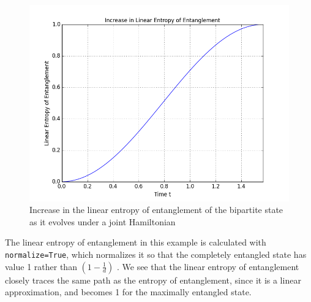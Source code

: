\begin{center}
\begin{figure}[H]
  \begin{center}
    \includegraphics[scale=0.62]{figures/timeevolution-02.png}
    \caption{Increase in the linear entropy of entanglement of the bipartite state as it evolves under a joint Hamiltonian}
    \label{fig: Time Evolution: Linear Entropy of Entanglement}
  \end{center}
\end{figure}
\end{center}

The linear entropy of entanglement in this example is calculated with \texttt{normalize=True}, which normalizes it so that the completely entangled state has value 1 rather than $(1-\frac{1}{d})$ \cite{linentropybellineq}. We see that the linear entropy of entanglement closely traces the same path as the entropy of entanglement, since it is a linear approximation, and becomes 1 for the maximally entangled state.

\pagebreak
